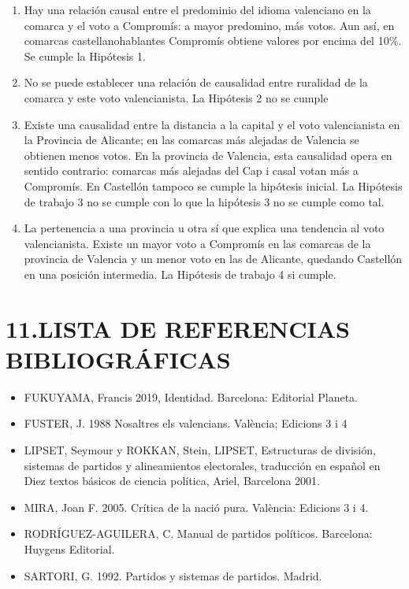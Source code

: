 \documentclass[
]{article}
\providecommand{\tightlist}{%
  \setlength{\itemsep}{0pt}\setlength{\parskip}{0pt}}
\begin{document}
\begin{enumerate}
\def\labelenumi{\arabic{enumi}.}
\item
  Hay una relación causal entre el predominio del idioma valenciano en
  la comarca y el voto a Compromís: a mayor predomino, más votos. Aun
  así, en comarcas castellanohablantes Compromís obtiene valores por
  encima del 10\%. Se cumple la Hipótesis 1.
\item
  No se puede establecer una relación de causalidad entre ruralidad de
  la comarca y este voto valencianista. La Hipótesis 2 no se cumple
\item
  Existe una causalidad entre la distancia a la capital y el voto
  valencianista en la Provincia de Alicante; en las comarcas más
  alejadas de Valencia se obtienen menos votos. En la provincia de
  Valencia, esta causalidad opera en sentido contrario: comarcas más
  alejadas del Cap i casal votan más a Compromís. En Castellón tampoco
  se cumple la hipótesis inicial. La Hipótesis de trabajo 3 no se cumple
  con lo que la hipótesis 3 no se cumple como tal.
\item
  La pertenencia a una provincia u otra sí que explica una tendencia al
  voto valencianista. Existe un mayor voto a Compromís en las comarcas
  de la provincia de Valencia y un menor voto en las de Alicante,
  quedando Castellón en una posición intermedia. La Hipótesis de trabajo
  4 si cumple.
\end{enumerate}

\hypertarget{lista-de-referencias-bibliogruxe1ficas}{%
\section{11.LISTA DE REFERENCIAS
BIBLIOGRÁFICAS}\label{lista-de-referencias-bibliogruxe1ficas}}

\begin{itemize}
\tightlist
\item
  FUKUYAMA, Francis 2019, Identidad. Barcelona: Editorial Planeta.
\item
  FUSTER, J. 1988 Nosaltres els valencians. València; Edicions 3 i 4
\item
  LIPSET, Seymour y ROKKAN, Stein, LIPSET, Estructuras de división,
  sistemas de partidos y alineamientos electorales, traducción en
  español en Diez textos básicos de ciencia política, Ariel, Barcelona
  2001.
\item
  MIRA, Joan F. 2005. Crítica de la nació pura. València: Edicions 3 i
  4.
\item
  RODRÍGUEZ-AGUILERA, C. Manual de partidos políticos. Barcelona:
  Huygens Editorial.
\item
  SARTORI, G. 1992. Partidos y sistemas de partidos. Madrid.
\end{itemize}
\end{document}
